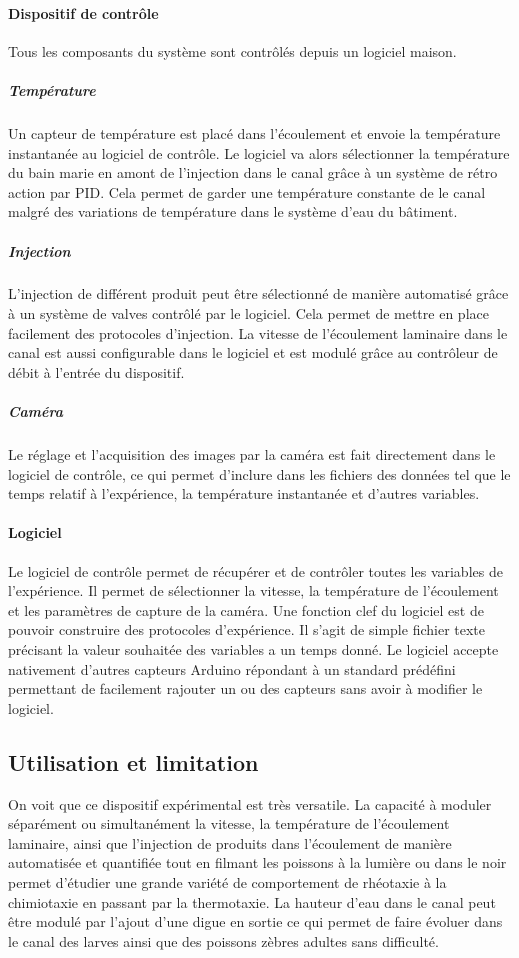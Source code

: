   \paragraph{Dispositif de contrôle}
  Tous les composants du système sont contrôlés depuis un logiciel maison.
  \subparagraph{Température}
  Un capteur de température est placé dans l'écoulement et envoie la température instantanée au logiciel de contrôle. Le logiciel va alors sélectionner la température du bain marie en amont de l'injection dans le canal grâce à un système de rétro action par PID. Cela permet de garder une température constante de le canal malgré des variations de température dans le système d'eau du bâtiment.
  \subparagraph{Injection}
  L'injection de différent produit peut être sélectionné de manière automatisé grâce à un système de valves contrôlé par le logiciel. Cela permet de mettre en place facilement des protocoles d'injection. La vitesse de l'écoulement laminaire dans le canal est aussi configurable dans le logiciel et est modulé grâce au contrôleur de débit à l'entrée du dispositif.
  \subparagraph{Caméra}
  Le réglage et l'acquisition des images par la caméra est fait directement dans le logiciel de contrôle, ce qui permet d'inclure dans les fichiers des données tel que le temps relatif à l'expérience, la température instantanée et d'autres variables.
  \paragraph{Logiciel}
  Le logiciel de contrôle permet de récupérer et de contrôler toutes les variables de l'expérience. Il permet de sélectionner la vitesse, la température de l'écoulement et les paramètres de capture de la caméra. Une fonction clef du logiciel est de pouvoir construire des protocoles d'expérience. Il s'agit de simple fichier texte précisant la valeur souhaitée des variables a un temps donné. Le logiciel accepte nativement d'autres capteurs Arduino répondant à un standard prédéfini permettant de facilement rajouter un ou des capteurs sans avoir à modifier le logiciel.
  \subsection{Utilisation et limitation}
  On voit que ce dispositif expérimental est très versatile. La capacité à moduler séparément ou simultanément la vitesse, la température de l'écoulement laminaire, ainsi que l'injection de produits dans l'écoulement de manière automatisée et quantifiée tout en filmant les poissons à la lumière ou dans le noir permet d'étudier une grande variété de comportement de rhéotaxie à la chimiotaxie en passant par la thermotaxie.
  La hauteur d'eau dans le canal peut être modulé par l'ajout d'une digue en sortie ce qui permet de faire évoluer dans le canal des larves ainsi que des poissons zèbres adultes sans difficulté.

